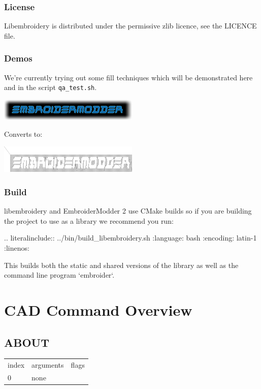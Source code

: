 \documentclass[10pt]{report}
\begin{document}
\subsection{License}

Libembroidery is distributed under the permissive zlib licence, see the LICENCE file.

\subsection{Demos}

We're currently trying out some fill techniques which will be demonstrated here
and in the script \texttt{qa\_test.sh}.

\includegraphics[width=0.5\textwidth]{images/logo-spirals.png}

Converts to:

\includegraphics[width=0.5\textwidth]{images/logo_spirals_cross_stitch.png}

\subsection{Build}

libembroidery and EmbroiderModder 2 use CMake builds
so if you are building the project to use as a library we recommend
you run:

.. literalinclude:: ../bin/build\_libembroidery.sh
   :language: bash
   :encoding: latin-1
   :linenos:

This builds both the static and shared versions of the library as well
as the command line program `embroider`.

\chapter{CAD Command Overview}

\section{ABOUT}

\begin{center}
\begin{tabular}{l | l | l}
index & arguments & flags \\
0 & none & 
\end{tabular}
\end{center}
\end{document}

